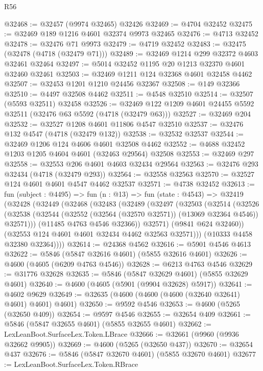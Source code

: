 \begin{lexlean}{R56}
\begin{coremodule}
@32468 := @32457 (@9974 @32465) @32426
@32469 := @4704 @32452
@32475 := @32469 @189 @1216 @4601 @32374 @9973 @32465
@32476 := @4713 @32452
@32478 := @32476 @71 @9973
@32479 := @4719 @32452
@32483 := @32475 (@32478 (@4718 (@32479 @71)))
@32489 := @32469 @1214 @299 @32372 @4603 @32461 @32464
@32497 := @5014 @32452 @1195 @20 @1213 @32370 @4601 @32460 @32461
@32503 := @32469 @1211 @124 @32368 @4601 @32458 @4462
@32507 := @32453 @1201 @1210 @24456 @32367
@32508 := @149 @32366
@32510 := @4497 @32508 @4462
@32511 := @4548 @32510
@32514 := @32507 (@5593 @32511) @32458
@32526 := @32469 @122 @1209 @4601 @24455 @5592 @32511 (@32476 @63 @5592 (@4718 (@32479 @63)))
@32527 := @32469 @204
@32532 := @32527 @1208 @4601 @11806 @4547 @32510
@32537 := @32476 @132 @4547 (@4718 (@32479 @132))
@32538 := @32532 @32537
@32544 := @32469 @1206 @124 @4606 @4601 @32508 @4462
@32552 := @4688 @32452 @1203 @1205 @4604 @4601 (@32463 @29564) @32508
@32553 := @32469 @297
@32558 := @32553 @206 @4601 @4603 @32434 @29564
@32563 := @32476 @293 @32434 (@4718 (@32479 @293))
@32564 := @32558 @32563
@32570 := @32527 @124 @4601 @4601 @4547 @4462 @32537
@32571 := @4738 @32452
@32613 := fun (subject : @4495) =>
  fun (n : @13) =>
  fun (state : @4543) =>
  @32419
    (@32428
      (@32449
        (@32468
          (@32483
            (@32489
              (@32497
                (@32503
                  (@32514
                    (@32526
                      (@32538
                        (@32544 (@32552 (@32564 (@32570 @32571)) (@13069 @32364 @4546)) @32571)))
                    (@11485 @4763 @4546 @32366))
                  @32571)
                (@9841 @624 @32460))
              (@32553 @124 @4601 @4601 @32434 @4462 @32563 @32571)))
          (@10333 @4458 @32380 @32364))))
@32614 := @24368 @4562
@32616 := @5901 @4546 @4613
@32622 := @5846 (@5847 @32616 @4601) (@5855 @32616 @4601)
@32626 := @4600 (@4605 (@6209 @4763 @4546))
@32628 := @6213 @4763 @4546
@32629 := @31776 @32628
@32635 := @5846 (@5847 @32629 @4601) (@5855 @32629 @4601)
@32640 := @4600 (@4605 (@5901 (@9904 @32628) @5917))
@32641 := @4602 @9629
@32649 := @32635 (@4600 (@4600 (@4600 (@32640 @32641) @4601) @4601) @4601)
@32650 := @9592 @4546
@32653 := @4600 (@5265 (@32650 @409))
@32654 := @9597 @4546
@32655 := @32654 @409
@32661 := @5846 (@5847 @32655 @4601) (@5855 @32655 @4601)
@32662 := LexLeanBoot.SurfaceLex.Token.LBrace
@32666 := @32661 (@9960 (@9936 @32662 @9905))
@32669 := @4600 (@5265 (@32650 @437))
@32670 := @32654 @437
@32676 := @5846 (@5847 @32670 @4601) (@5855 @32670 @4601)
@32677 := LexLeanBoot.SurfaceLex.Token.RBrace

\end{coremodule}
\end{lexlean}
